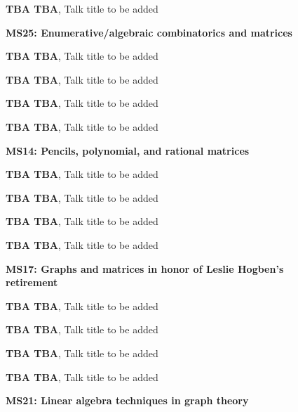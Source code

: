 \documentclass[ILAS2025-program.tex]{subfiles}
\begin{document}
\begin{description}
\begin{description}
        \item[] \textbf{TBA TBA}, Talk title to be added
        \end{description}
    \begin{description}
    \item[] \textbf{MS25: Enumerative/algebraic combinatorics and matrices} 
    \item[] \textbf{TBA TBA}, Talk title to be added
        \item[] \textbf{TBA TBA}, Talk title to be added
        \item[] \textbf{TBA TBA}, Talk title to be added
        \item[] \textbf{TBA TBA}, Talk title to be added
        \end{description}
    \begin{description}
    \item[] \textbf{MS14: Pencils, polynomial, and rational matrices} 
    \item[] \textbf{TBA TBA}, Talk title to be added
        \item[] \textbf{TBA TBA}, Talk title to be added
        \item[] \textbf{TBA TBA}, Talk title to be added
        \item[] \textbf{TBA TBA}, Talk title to be added
        \end{description}
    \begin{description}
    \item[] \textbf{MS17: Graphs and matrices in honor of Leslie Hogben's retirement} 
    \item[] \textbf{TBA TBA}, Talk title to be added
        \item[] \textbf{TBA TBA}, Talk title to be added
        \item[] \textbf{TBA TBA}, Talk title to be added
        \item[] \textbf{TBA TBA}, Talk title to be added
        \end{description}
    \begin{description}
    \item[] \textbf{MS21: Linear algebra techniques in graph theory} 

\end{description}
\end{description}
\end{document}
